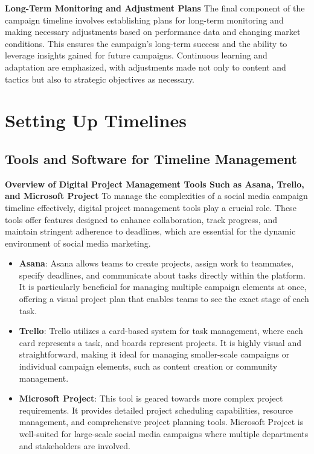 \documentclass[
]{book}
\providecommand{\tightlist}{%
  \setlength{\itemsep}{0pt}\setlength{\parskip}{0pt}}
\begin{document}
\textbf{Long-Term Monitoring and Adjustment Plans}
The final component of the campaign timeline involves establishing plans for long-term monitoring and making necessary adjustments based on performance data and changing market conditions. This ensures the campaign's long-term success and the ability to leverage insights gained for future campaigns. Continuous learning and adaptation are emphasized, with adjustments made not only to content and tactics but also to strategic objectives as necessary.

\hypertarget{setting-up-timelines}{%
\section{Setting Up Timelines}\label{setting-up-timelines}}

\hypertarget{tools-and-software-for-timeline-management}{%
\subsection*{Tools and Software for Timeline Management}\label{tools-and-software-for-timeline-management}}

\textbf{Overview of Digital Project Management Tools Such as Asana, Trello, and Microsoft Project}
To manage the complexities of a social media campaign timeline effectively, digital project management tools play a crucial role. These tools offer features designed to enhance collaboration, track progress, and maintain stringent adherence to deadlines, which are essential for the dynamic environment of social media marketing.

\begin{itemize}
\tightlist
\item
  \textbf{Asana}: Asana allows teams to create projects, assign work to teammates, specify deadlines, and communicate about tasks directly within the platform. It is particularly beneficial for managing multiple campaign elements at once, offering a visual project plan that enables teams to see the exact stage of each task.
\item
  \textbf{Trello}: Trello utilizes a card-based system for task management, where each card represents a task, and boards represent projects. It is highly visual and straightforward, making it ideal for managing smaller-scale campaigns or individual campaign elements, such as content creation or community management.
\item
  \textbf{Microsoft Project}: This tool is geared towards more complex project requirements. It provides detailed project scheduling capabilities, resource management, and comprehensive project planning tools. Microsoft Project is well-suited for large-scale social media campaigns where multiple departments and stakeholders are involved.
\end{itemize}
\end{document}
